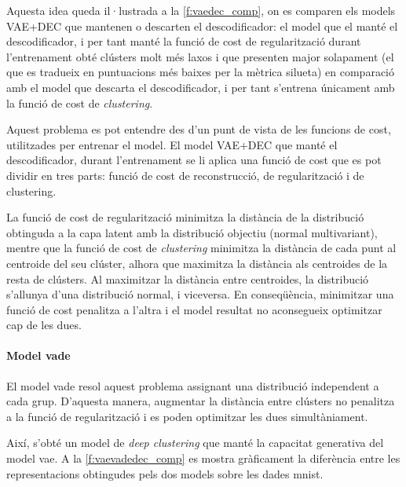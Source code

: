 \documentclass[CAT,BIB]{TFUOC}%
\begin{document}
        Aquesta idea queda il·lustrada a la \cref{f:vaedec_comp},
        on es comparen els models VAE+DEC que mantenen o descarten el descodificador:
        el model que el manté el descodificador,
        i per tant manté la funció de cost de regularització durant l'entrenament
        obté clústers molt més laxos i que presenten major solapament
        (el que es tradueix en puntuacions més baixes per la mètrica silueta)
        en comparació amb el model que descarta el descodificador,
        i per tant s'entrena únicament amb la funció de cost de \textit{clustering}.

        Aquest problema es pot entendre
        des d'un punt de vista de les funcions de cost,
        utilitzades per entrenar el model.
        El model VAE+DEC que manté el descodificador,
        durant l'entrenament se li aplica una funció de cost
        que es pot dividir en tres parts:
        funció de cost de reconstrucció,
        de regularització
        i de clustering.

        La funció de cost de regularització
        minimitza la distància de la distribució obtinguda a la capa latent
        amb la distribució objectiu (normal multivariant),
        mentre que la funció de cost de \textit{clustering}
        minimitza la distància de cada punt al centroide del seu clúster,
        alhora que maximitza la distància als centroides de la resta de clústers.
        Al maximitzar la distància entre centroides,
        la distribució s'allunya d'una distribució normal,
        i viceversa.
        En conseqüència, minimitzar una funció de cost penalitza a l'altra
        i el model resultat no aconsegueix optimitzar cap de les dues.


    \paragraph{Model \gls{vade}}

        El model \gls{vade} resol aquest problema
        assignant una distribució independent a cada grup.
        D'aquesta manera,
        augmentar la distància entre clústers
        no penalitza a la funció de regularització
        i es poden optimitzar les dues simultàniament.

        Així, s'obté un model de \textit{deep clustering}
        que manté la capacitat generativa del model \gls{vae}.
        A la \cref{f:vaevadedec_comp} es mostra gràficament
        la diferència entre les representacions obtingudes pels dos models
        sobre les dades \gls{mnist}.
\end{document}
